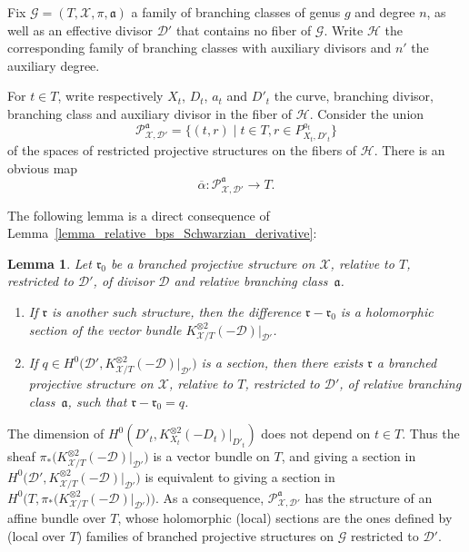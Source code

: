 \documentclass[JEP,XML,SOM,Unicode,NoEqCountersInSection,published]{cedram}
\theoremstyle{definition}
\theoremstyle{plain}
\newtheorem{lemma}[definition]{Lemma}
\begin{document}
Fix $\mathcal G = (T, \mathcal X, \pi, \mathfrak a)$ a family of branching classes of genus $g$ and degree $n$, as well as an effective divisor $\mathcal D'$ that contains no fiber of $\mathcal G$.
Write $\mathcal H$ the corresponding family of branching classes with auxiliary divisors and $n'$ the auxiliary degree.

For $t \in T$, write respectively $X_t$, $D_t$, $a_t$ and $D'_t$ the curve, branching divisor, branching class and auxiliary divisor in the fiber of $\mathcal H$.
Consider the union\vspace*{-3pt}
\begin{equation*}
\mathcal P_{\mathcal X, \mathcal D'}^{\mathfrak a} = \bigl\{(t, r)\mid t \in T, r \in P_{X_t, D'_t}^{a_t}\bigr\}
\end{equation*}
of the spaces of restricted projective structures on the fibers of $\mathcal H$.
There is an obvious map\vspace*{-3pt}
\begin{equation*}
\overline \alpha: \mathcal P_{\mathcal X, \mathcal D'}^{\mathfrak a} \to T.
\end{equation*}

The following lemma is a direct consequence of Lemma~\ref{lemma_relative_bps_Schwarzian_derivative}:

\begin{lemma}
Let $\mathfrak r_0$ be a branched projective structure on $\mathcal X$, relative to $T$, restricted to $\mathcal D'$, of divisor $\mathcal D$ and relative branching class~$\mathfrak a$.
\begin{enumerate}
\item
If $\mathfrak r$ is another such structure, then the difference $\mathfrak r - \mathfrak r_0$ is a holomorphic section of the vector bundle $K_{\mathcal X/T}^{\otimes 2}(-\mathcal D)|_{\mathcal D'}$.
\item
If $q \in H^0\bigl(\mathcal D', K_{\mathcal X/T}^{\otimes 2}(-\mathcal D)|_{\mathcal D'}\bigr)$ is a section, then there exists $\mathfrak r$ a branched projective structure on $\mathcal X$, relative to $T$, restricted to $\mathcal D'$, of relative branching class~$\mathfrak a$, such that $\mathfrak r-\mathfrak r_0 = q$.
\end{enumerate}
\end{lemma}

The dimension of $H^0\left(D'_t, K_{X_t}^{\otimes 2}\left(-D_t\right)|_{D'_t}\right)$ does not depend on $t \in T$.
Thus the sheaf $\pi_*\bigl(K_{\mathcal X/T}^{\otimes 2}(-\mathcal D)|_{\mathcal D'}\bigr)$ is a vector bundle on $T$, and giving a section in $H^0\bigl(\mathcal D', K_{\mathcal X/T}^{\otimes 2}(-\mathcal D)|_{\mathcal D'}\bigr)$ is equivalent to giving a section in $
H^0\bigl(T, \pi_*\bigl(K_{\mathcal X/T}^{\otimes 2}(-\mathcal D)|_{\mathcal D'}\bigr) \bigr)$.
As a consequence, $\mathcal P_{\mathcal X, \mathcal D'}^{\mathfrak a}$ has the structure of an affine bundle over $T$, whose holomorphic (local) sections are the ones defined by (local over $T$) families of branched projective structures on $\mathcal G$ restricted to $\mathcal D'$.
\end{document}
